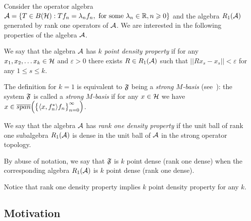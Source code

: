 \documentclass[12pt]{amsart}
\theoremstyle{case}
\begin{document}
    Consider the operator algebra $\cal{A} = \{T\in B(\cal{H}): Tf_n = \lambda_n f_n, \text{ for some } \lambda_n \in \mathbb{R}, n \geq 0\}$
      and the algebra $R_1(\cal{A})$ generated by rank one operators of $\cal{A}$.
    We are interested in the following properties of the algebra $\cal{A}$.
    \begin{definition}
      \label{kpd}
      We say that the algebra $\cal{A}$ has \emph{$k$ point density property} if for any $x_1, x_2,\dots x_k \in \cal{H}$ and $\varepsilon > 0$
        there exists $R\in R_1(\cal{A})$ such that $||Rx_s - x_s|| < \varepsilon$ for any $1 \leq s \leq k$.
    \end{definition}
    The definition for $k=1$ is equivalent to $\fsys$ being a \emph{strong $M$-basis} (see~\cite{katavolos}):
      the system $\fsys$ is called a \emph{strong $M$-basis} if for any $x\in\cal{H}$ we have $x \in \overline{span}\Big(\big\{\inner{x}{f^*_n}f_n\big\}_{n=0}^\infty\Big)$.
    \begin{definition}
      \label{r1d}
      We say that the algebra $\cal{A}$ has \emph{rank one density property} if the unit ball of rank one subalgebra $R_1(\cal{A})$
        is dense in the unit ball of $\cal{A}$ in the strong operator topology.
    \end{definition}
    By abuse of notation, we say that $\fsys$ is $k$ point dense (rank one dense)
      when the corresponding algebra $R_1(\cal{A})$ is $k$ point dense (rank one dense).

    Notice that rank one density property implies $k$ point density property for any $k$.

  \subsection{Motivation}
\end{document}

